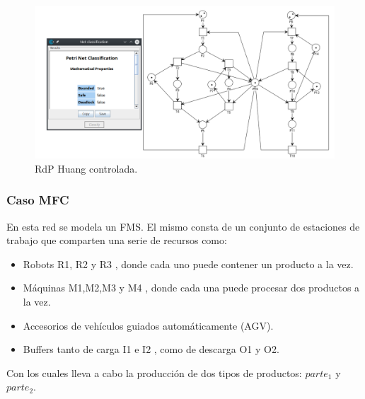 \begin{figure}[H]
	\centering
	\includegraphics[scale=0.46]{Figures/algoritmo3/Huang5.png}
	\caption{RdP Huang controlada.}
	\label{fig:huang_controlada}
 \end{figure}
 \bigskip

\subsubsection{Caso MFC}
En esta red se modela un FMS. El mismo consta de un conjunto de estaciones de trabajo que comparten una serie de recursos como: 
\begin{itemize}
    \item Robots R1, R2 y R3 , donde cada uno puede contener un producto a la vez.
    \item Máquinas M1,M2,M3 y M4 , donde cada una puede procesar dos productos a la vez.
    \item Accesorios de vehículos guiados automáticamente (AGV).
    \item Buffers tanto de carga I1 e I2 , como de descarga O1 y O2.
\end{itemize}

\noindent Con los cuales lleva a cabo la producción de dos tipos de productos: $parte_1$ y $parte_2$.
\bigskip

